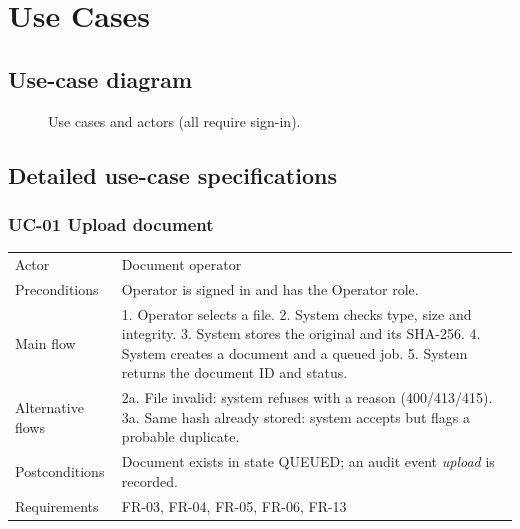 \chapter{Use Cases}
\section{Use-case diagram}
\begin{figure}[H]\centering
\resizebox{\textwidth}{!}{}
\caption{Use cases and actors (all require sign-in).}\label{fig:uc1}
\end{figure}

\section{Detailed use-case specifications}
\subsection*{UC-01 Upload document}
{\tblstart\small
\begin{longtable}{L{3.0cm}L{10.8cm}}
Actor & Document operator\\
Preconditions & Operator is signed in and has the Operator role.\\
Main flow & 1. Operator selects a file. 2. System checks type, size and integrity. 3. System stores the original and its SHA-256. 4. System creates a document and a queued job. 5. System returns the document ID and status.\\
Alternative flows & 2a. File invalid: system refuses with a reason (400/413/415). 3a. Same hash already stored: system accepts but flags a probable duplicate.\\
Postconditions & Document exists in state QUEUED; an audit event \emph{upload} is recorded.\\
Requirements & FR-03, FR-04, FR-05, FR-06, FR-13\\
\hline
\end{longtable}}

